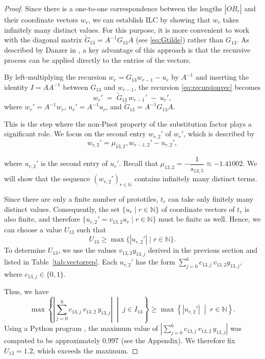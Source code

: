 \begin{proof}
Since there is a one-to-one correspondence between the lengths $|\overline{OB_r}|$ and their coordinate vectors $w_r$, we can establish ILC by showing that $w_r$ takes infinitely many distinct values. For this purpose, it is more convenient to work with the diagonal matrix $\widetilde{G}_{13} = A^{-1} G_{13} A$ (see \ref{eq:Gtilde}) rather than $G_{13}$. As described by Danzer in \cite{Danz02}, a key advantage of this approach is that the recursive process can be applied directly to the entries of the vectors.

By left-multiplying the recursion $w_r = G_{13} w_{r-1} - u_r$ by $A^{-1}$ and inserting the identity $I = A A^{-1}$ between $G_{13}$ and $w_{r-1}$, the recursion \eqref{eq:recursionvec} becomes
\begin{equation}
\label{eq:recursionsecond}
w_r' \;=\; \widetilde{G}_{13}\, w_{r-1}' \;-\; u_r',
\end{equation}
where $w_r'= A^{-1} w_r$, $u_r'= A^{-1} u_r$, and $\widetilde{G}_{13}= A^{-1} G_{13} A$.

This is the step where the non-Pisot property of the substitution factor plays a significant role. We focus on the second entry $w_{r,2}'$ of $w_r'$, which is described by
\begin{equation}
\label{eq:recursionsecondeig}
w_{r,2}' = \mu_{13,2} , w_{{r-1},2}' - u_{r,2}',
\end{equation}

\noindent where $u_{r,2}'$ is the second entry of $u_r'$. Recall that $\mu_{13,2} = -\dfrac{1}{s_{13,5}} \approx -1.41002$. We will show that the sequence $(w_{r,2}')_{r\in\mathbb{N}}$ contains infinitely many distinct terms.  

Since there are only a finite number of prototiles, $t_r$ can take only finitely many distinct values. Consequently, the set $\{u_r \mid r \in \mathbb{N}\}$ of coordinate vectors of $t_r$ is also finite, and therefore $\{u_{r,2}' = v_{13,2} u_r \mid r \in \mathbb{N}\}$ must be finite as well. Hence, we can choose a value $U_{13}$ such that
$$
U_{13} \geq \max \{ |u_{r,2}'| \mid r \in \mathbb{N} \}.
$$
To determine $U_{13}$, we use the values $v_{13,2} y_{13,j}$ derived in the previous section and listed in Table~\ref{tab:vectorrep}. Each $u_{r,2}'$ has the form $\sum_{j=0}^6 c_{13,j} \, v_{13,2} y_{13,j}$, where $c_{13,j} \in \{0,1\}$.

Thus, we have
$$
\max \left\{ \left| \sum_{j=0}^{6} c_{13,j} \, v_{13,2} \, y_{13,j} \right| \;\middle|\; j \in I_{13}\right\} 
\geq 
\max \left\{ \left| u_{r,2}' \right| \;\middle|\; r \in \mathbb{N} \right\}.
$$
Using a Python program \cite{PythonManual}, the maximum value of  $\left| \sum_{j=0}^{6} c_{13,j} \, v_{13,2} \, y_{13,j} \right|$
was computed to be approximately $0.997$ (see the Appendix). We therefore fix $U_{13} = 1.2$, which exceeds the maximum.


\end{proof}
